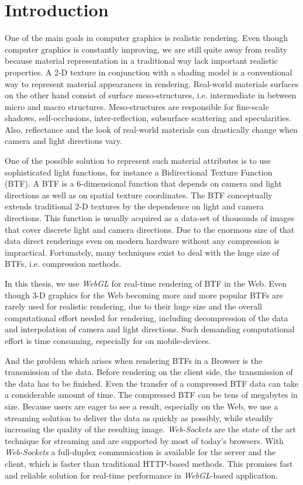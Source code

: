 \chapter{Introduction}
\label{chapter:introduction}

One of the main goals in computer graphics is realistic rendering. 
Even though computer graphics is constantly improving, we are still quite away from reality because material representation in a traditional way lack important realistic properties. 
A 2-D texture in conjunction with a shading model is a conventional way to represent material appearances in rendering.
Real-world materials surfaces on the other hand consist of surface meso-structures, i.e. intermediate in between micro and macro structures.
Meso-structures are responsible for fine-scale shadows, self-occlusions, inter-reflection, subsurface scattering and specularities.
Also, reflectance and the look of real-world materials can drastically change when camera and light directions vary.

One of the possible solution to represent such material attributes is to use sophisticated light functions, for instance a Bidirectional Texture Function (BTF). 
 A BTF is a 6-dimensional function that depends on camera and light directions as well as on spatial texture coordinates. 
The BTF conceptually extends traditional 2-D textures by the dependence on light and camera directions.
This function is usually acquired as a data-set of thousands of images that cover discrete light and camera directions.
Due to the enormous size of that data direct renderings even on modern hardware without any compression is impractical.
Fortunately, many techniques exist to deal with the huge size of BTFs, i.e. compression methods.


In this thesis, we use \emph{WebGL} for real-time rendering of BTF in the Web.
Even though 3-D graphics for the Web becoming more and more popular BTFs are rarely used for realistic rendering, due to their huge size and the overall computational effort needed for rendering,
including decompression of the data and interpolation of camera and light directions.
Such demanding computational effort is time consuming, especially for on mobile-devices.

And the problem which arises when rendering BTFs in a Browser is the transmission of the data.
Before rendering on the client side, the transmission of the data has to be finished.
Even the transfer of a compressed BTF data can take a considerable amount of time. 
The compressed BTF can be tens of megabytes in size.
Because users are eager to see a result, especially on the Web, we use a streaming solution to deliver the data as quickly as possibly, while steadily increasing the quality of the resulting image.
 \emph{Web-Sockets} are the state of the art technique for streaming and are supported by most of today's browsers.
With \emph{Web-Sockets}  a  full-duplex communication is available for the server and the client, which is faster than traditional HTTP-based methods. 
This promises fast and reliable solution for real-time performance in \emph{WebGL}-based application.

